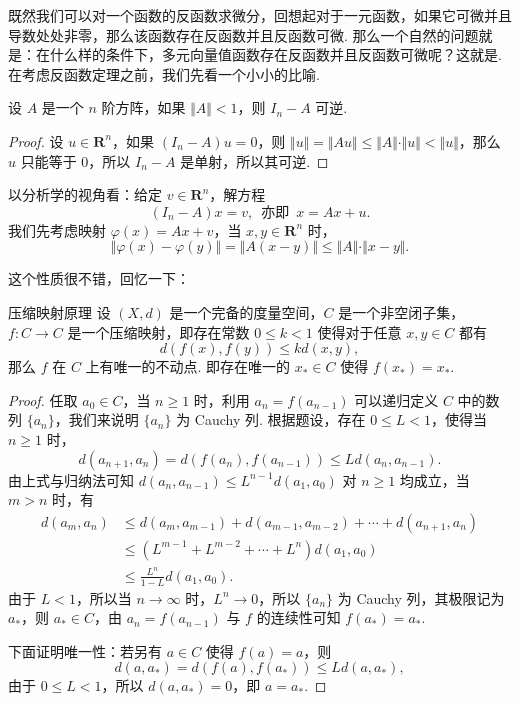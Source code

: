 既然我们可以对一个函数的反函数求微分，回想起对于一元函数，如果它可微并且导数处处非零，那么该函数存在反函数并且反函数可微. 那么一个自然的问题就是：在什么样的条件下，多元向量值函数存在反函数并且反函数可微呢？这就是. 在考虑反函数定理之前，我们先看一个小小的比喻.

\begin{example}{}{}
    设 $A$ 是一个 $n$ 阶方阵，如果 $\Vert A\Vert < 1$，则 $I_n - A$ 可逆.
\end{example}

\begin{proof}
    设 $u\in \mathbf{R}^n$，如果 $(I_n - A)u = 0$，则 $\Vert u\Vert = \Vert Au\Vert \leqslant \Vert A\Vert \cdot \Vert u\Vert < \Vert u\Vert$，那么 $u$ 只能等于 $0$，所以 $I_n - A$ 是单射，所以其可逆.
\end{proof}

以分析学的视角看：给定 $v\in \mathbf{R}^n$，解方程 \[(I_n - A)x = v,\enspace\text{亦即}\enspace x = Ax+u.\]
我们先考虑映射 $\varphi(x) = Ax+v$，当 $x,y\in \mathbf{R}^n$ 时，\[\Vert \varphi(x) - \varphi(y)\Vert = \Vert A(x - y)\Vert\leqslant \Vert A\Vert\cdot \Vert x - y\Vert.\]

这个性质很不错，回忆一下：

\begin{theorem}{压缩映射原理}{}
    设 $(X,d)$ 是一个完备的度量空间，$C$ 是一个非空闭子集，$f\colon C\to C$ 是一个压缩映射，即存在常数 $0\leqslant k < 1$ 使得对于任意 $x, y\in C$ 都有 \[d(f(x), f(y))\leqslant kd(x, y),\]那么 $f$ 在 $C$ 上有唯一的不动点. 即存在唯一的 $x_*\in C$ 使得 $f(x_*) = x_*$.
\end{theorem}

\begin{proof}
    任取 $a_0 \in C$，当 $n\geqslant 1$ 时，利用 $a_n = f(a_{n-1})$ 可以递归定义 $C$ 中的数列 $\{a_n\}$，我们来说明 $\{a_n\}$ 为 Cauchy 列. 根据题设，存在 $0\leqslant L <1$，使得当 $n\geqslant 1$ 时，\[d(a_{n+1}, a_n) = d(f(a_n), f(a_{n-1}))\leqslant Ld(a_n, a_{n-1}).\]
    由上式与归纳法可知 $d(a_n,a_{n-1})\leqslant L^{n-1}d(a_1, a_0)$ 对 $n\geqslant 1$ 均成立，当 $m > n$ 时，有
    \begin{align}
        d(a_m, a_n) & \leqslant d(a_m, a_{m-1}) + d(a_{m-1}, a_{m-2}) + \cdots + d(a_{n+1}, a_n) \\
                    & \leqslant (L^{m-1} + L^{m-2} + \cdots + L^{n})d(a_1, a_0)                  \\
                    & \leqslant \frac{L^n}{1-L}d(a_1, a_0).
    \end{align}
    由于 $L < 1$，所以当 $n\to\infty$ 时，$L^n\to 0$，所以 $\{a_n\}$ 为 Cauchy 列，其极限记为 $a_*$，则 $a_*\in C$，由 $a_n = f(a_{n-1})$ 与 $f$ 的连续性可知 $f(a_*) = a_*$.

    下面证明唯一性：若另有 $a\in C$ 使得 $f(a) = a$，则\[d(a, a_*) = d(f(a), f(a_*))\leqslant Ld(a, a_*),\]由于 $0\leqslant L < 1$，所以 $d(a, a_*) = 0$，即 $a = a_*$.
\end{proof}

